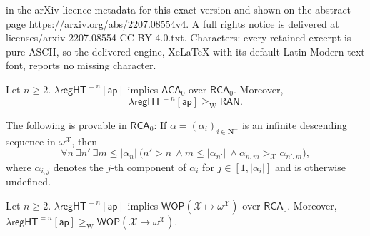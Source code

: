 \documentclass[10pt,a4paper]{amsart}
\newcommand\ACA{\mathsf{ACA}}
\newcommand\Nat{\mathbf{N}}
\newcommand\RAN{\mathsf{RAN}}
\newcommand\RCA{\mathsf{RCA}}
\newcommand\WOP{\mathsf{WOP}}
\newcommand\W{\mathrm{W}}
\newcommand\ap{\mathsf{ap}}
\newcommand\ordX{\mathcal{X}}
\newcommand\regHT{\mathsf{regHT}}
\begin{document}
in the arXiv licence metadata for this exact version and shown on the abstract page https://arxiv.org/abs/2207.08554v4. A full rights notice is delivered at licenses/arxiv-2207.08554-CC-BY-4.0.txt. Characters: every retained excerpt is pure ASCII, so the delivered engine, XeLaTeX with its default Latin Modern text font, reports no missing character.
\begin{theorem}\label{thm:regtoaca}
Let $n\geq 2$.
$\lambda\regHT^{= n}[\ap]$ implies $\ACA_0$ over $\RCA_0$. Moreover, 
$$\lambda\regHT^{=n}[\ap]\geq_\W \RAN.$$
\end{theorem}

\begin{lemma}\label{claim1} The following is provable in $\RCA_0$: If $\alpha=(\alpha_i)_{i\in\Nat^+}$ is an infinite descending sequence in $\omega^\ordX$, then
$$\forall n\ \exists n'\ \exists m\leq |\alpha_n| \ \big(n'>n \ \land m \leq |\alpha_{n'}| \ \land \alpha_{n,m} >_{\ordX} \alpha_{n',m}\big),$$
where $\alpha_{i,j}$ denotes the $j$-th component of $\alpha_i$ for $j \in [1,|\alpha_i|]$ and is otherwise undefined.
\end{lemma}

\begin{theorem}\label{thm:reghtwop}
Let $n \geq 2$. $\lambda\regHT^{= n}[\ap]$ implies $\WOP(\ordX\mapsto \omega^\ordX)$ over $\RCA_0$.
Moreover, $\lambda\regHT^{=n}[\ap]\geq_\W \WOP(\ordX\mapsto \omega^\ordX)$.
\end{theorem}
\end{document}
